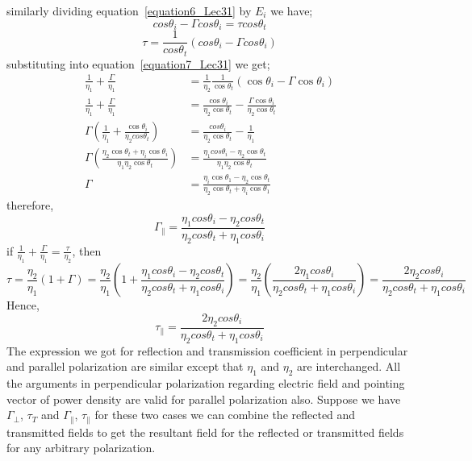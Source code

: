 similarly dividing  equation~\ref{equation6_Lec31} by $E_{i}$ we have;
\begin{equation}
cos\theta_{i} - \Gamma cos\theta_{i} = \tau cos\theta_{t}
\end{equation}
\begin{equation*}
\tau = \frac{1}{cos\theta_{t}} (cos\theta_{i} - \Gamma cos\theta_{i})
\end{equation*}
substituting into equation~\ref{equation7_Lec31} we get;
\begin{align*}
\frac{1}{\eta_{1}} + \frac{\Gamma}{\eta_{1}} &= \frac{1}{\eta_{2}} \frac{1}{\cos\theta_{t}} (\cos\theta_{i} - \Gamma \cos\theta_{i})\\
\frac{1}{\eta_{1}} + \frac{\Gamma}{\eta_{1}} &= \frac{\cos \theta_{i}}{\eta_{2}\cos \theta_{t}} - \frac{\Gamma \cos\theta_{i}}{\eta_{2} \cos\theta_{t}}\\
\Gamma \left(\frac{1}{\eta_{1}} + \frac{\cos\theta_{i}}{\eta_{2} cos\theta_{t}}\right) &= \frac{cos\theta_{i}}{\eta_{2} \cos\theta_{t}} - \frac{1}{\eta_{1}}\\
\Gamma \left(\frac{\eta_{2} \cos\theta_{t} + \eta_{i} \cos\theta_{i}}{\eta_{1} \eta_{2} \cos\theta_{t}}\right) &= \frac{\eta_{1} cos\theta_{i} - \eta_{2} \cos\theta_{t}}{\eta_{1} \eta_{2} \cos\theta_{t}}\\
\Gamma &= \frac{\eta_{i} \cos\theta_{1} - \eta_{2} \cos\theta_{t}}{\eta_{2} \cos\theta_{t} + \eta_{i} \cos\theta_{1}}
\end{align*}
therefore,
\begin{dmath}
\Gamma_{\parallel} = \frac{\eta_{1} cos\theta_{i} - \eta_{2} cos\theta_{t}}{\eta_{2} cos\theta_{t} + \eta_{1} cos\theta_{i}}
\end{dmath}
if $\frac{1}{\eta_{1}} + \frac{\Gamma}{\eta_{1}} = \frac{\tau}{\eta_{2}}$,  then 
\begin{dmath*}
\tau = \frac{\eta_{2}}{\eta_{1}} (1 + \Gamma)
= \frac{\eta_{2}}{\eta_{1}} (1 + \frac{\eta_{1} cos\theta_{i} - \eta_{2} cos\theta_{t}}{\eta_{2} cos\theta_{t} + \eta_{1} cos\theta_{i}})
= \frac{\eta_{2}}{\eta_{1}} (\frac{2\eta_{1} cos\theta_{i}}{\eta_{2} cos\theta_{t} + \eta_{1} cos\theta_{i}})
= \frac{2 \eta_{2} cos\theta_{i}}{\eta_{2} cos\theta_{t} + \eta_{1} cos\theta_{i}}
\end{dmath*}
Hence,
\begin{equation}
\tau_{\parallel} = \frac{2\eta_{2} cos\theta_{i} }{\eta_{2} cos\theta_{t} + \eta_{1} cos\theta_{i}} 
\end{equation}
The expression we got for reflection and transmission coefficient in perpendicular and parallel polarization are similar except that $\eta_{1}$ and $\eta_{2}$ are interchanged. All the arguments in perpendicular polarization regarding electric field and pointing vector of power density are valid for parallel polarization also. Suppose we have $\Gamma_{\perp}$, $\tau_{T}$ and $\Gamma_{\parallel}$, $\tau_{\parallel}$ for these two cases we can combine the reflected and transmitted fields to get the resultant field for the reflected or transmitted fields for any arbitrary  polarization.

